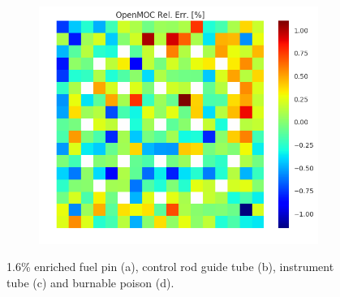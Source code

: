 \begin{figure}[h!]
\begin{subfigure}{.33\textwidth}
  \caption{}
  \label{fig:chap8-assm-1.6-degenerate-capt-8}
\end{subfigure}%
\begin{subfigure}{.33\textwidth}
  \centering
  \includegraphics[width=\linewidth]{figures/quantification/assm-16/degenerate-capt-err-70}
  \caption{}
  \label{fig:chap8-assm-1.6-degenerate-capt-70}
\end{subfigure}
\caption[U-238 capture rate errors for a 1.6\& enriched assembly]{1.6\% enriched fuel pin (a), control rod guide tube (b), instrument tube (c) and burnable poison (d).}
\label{fig:chap8-assm-1.6-capt-err}
\end{figure}


